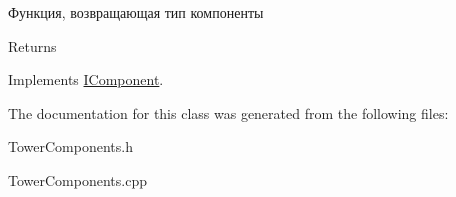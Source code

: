 Функция, возвращающая тип компоненты 

\begin{DoxyReturn}{Returns}

\end{DoxyReturn}


Implements \hyperlink{classIComponent_abc6bea1a66ef9d2227373e0ff8553b75}{I\+Component}.



The documentation for this class was generated from the following files\+:\begin{DoxyCompactItemize}
\item 
Tower\+Components.\+h\item 
Tower\+Components.\+cpp\end{DoxyCompactItemize}
